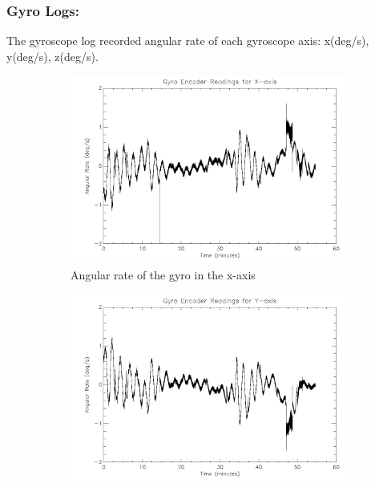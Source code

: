 \newpage
\subsubsection*{Gyro Logs:}
The gyroscope log recorded angular rate of each gyroscope axis: x(deg/s), y(deg/s), z(deg/s).

\begin{figure}[htbp]
\captionsetup[subfigure]{justification=centering}
\captionsetup{justification=centering}
    \centering
	\begin{subfigure}{0.45\textwidth}
		\includegraphics[width=1\linewidth]{appendix/img/campaign_results/gyrox.png}
		\caption{Angular rate of the gyro in the x-axis}
		\label{fig:sub:gyrox}
	\end{subfigure}
	\begin{subfigure}{0.45\textwidth}
		\includegraphics[width=1\linewidth]{appendix/img/campaign_results/gyroy.png}

\end{subfigure}
\end{figure}
